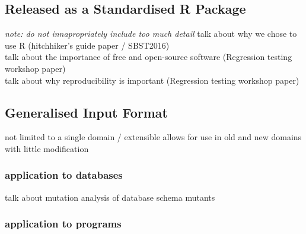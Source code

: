\subsection{Released as a Standardised R Package}
\textit{note: do not innapropriately include too much detail}
talk about why we chose to use R (hitchhiker's guide paper / SBST2016)\\
talk about the importance of free and open-source software (Regression testing workshop paper)\\
talk about why reproducibility is important (Regression testing workshop paper)


\subsection{Generalised Input Format}
not limited to a single domain / extensible
allows for use in old and new domains with little modification
    \subsubsection{application to databases}
    talk about mutation analysis of database schema mutants
    \subsubsection{application to programs}

